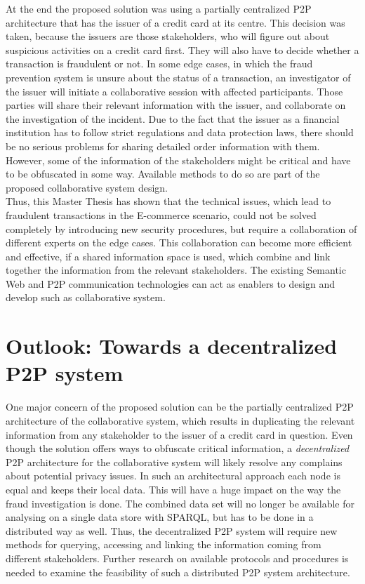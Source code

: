 At the end the proposed solution was using a partially centralized \gls{P2P} architecture that has the issuer of a credit card at its centre. This decision was taken, because the issuers are those stakeholders, who will figure out about suspicious activities on a credit card first. They will also have to decide whether a transaction is fraudulent or not. In some edge cases, in which the fraud prevention system is unsure about the status of a transaction, an investigator of the issuer will initiate a collaborative session with affected participants. Those parties will share their relevant information with the issuer, and collaborate on the investigation of the incident. Due to the fact that the issuer as a financial institution has to follow strict regulations and data protection laws, there should be no serious problems for sharing detailed order information with them. However, some of the information of the stakeholders might be critical and have to be obfuscated in some way. Available methods to do so are part of the proposed collaborative system design. \\

Thus, this Master Thesis has shown that the technical issues, which lead to fraudulent transactions in the \gls{E-commerce} scenario, could not be solved completely by introducing new security procedures, but require a collaboration of different experts on the edge cases. This collaboration can become more efficient and effective, if a shared information space is used, which combine and link together the information from the relevant stakeholders. The existing Semantic Web and \gls{P2P} communication technologies can act as enablers to design and develop such as collaborative system.

\section{Outlook: Towards a decentralized \gls{P2P} system}
\label{sec:p2p_decentralized_system}

One major concern of the proposed solution can be the partially centralized \gls{P2P} architecture of the collaborative system, which results in duplicating the relevant information from any stakeholder to the issuer of a credit card in question. Even though the solution offers ways to obfuscate critical information, a \emph{decentralized} \gls{P2P} architecture for the collaborative system will likely resolve any complains about potential privacy issues. In such an architectural approach each node is equal and keeps their local data. This will have a huge impact on the way the fraud investigation is done. The combined data set will no longer be available for analysing on a single data store with \gls{SPARQL}, but has to be done in a distributed way as well. Thus, the decentralized \gls{P2P} system will require new methods for querying, accessing and linking the information coming from different stakeholders. Further research on available protocols and procedures is needed to examine the feasibility of such a distributed \gls{P2P} system architecture.


